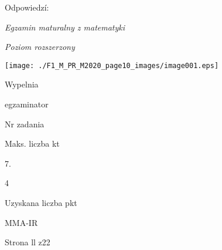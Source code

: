 \documentclass[a4paper,12pt]{article}
\begin{document}
Odpowiedzí:

{\it Egzamin maturalny z matematyki}

{\it Poziom rozszerzony}
\begin{center}
\texttt{[image: ./F1\_M\_PR\_M2020\_page10\_images/image001.eps]}
\end{center}
Wypelnia

egzaminator

Nr zadania

Maks. liczba kt

7.

4

Uzyskana liczba pkt

MMA-IR

Strona ll z22
\end{document}
